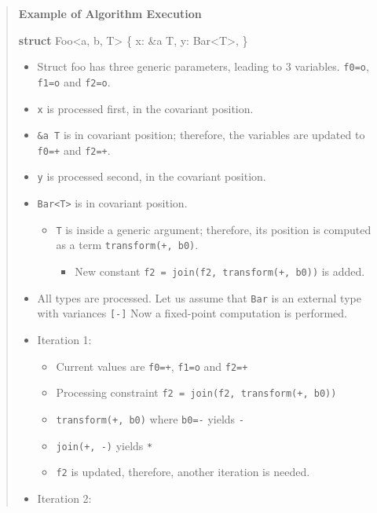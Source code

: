 \documentclass[
  11pt,
  twoside,symmetric]{report}
\newenvironment{Shaded}{}{}
\newcommand{\KeywordTok}[1]{\textbf{#1}}
\newcommand{\NormalTok}[1]{#1}
\newcommand{\OperatorTok}[1]{#1}
\newcommand{\OtherTok}[1]{#1}
\providecommand{\tightlist}{%
  \setlength{\itemsep}{0pt}\setlength{\parskip}{0pt}}
\begin{document}
\begin{quote}
\textbf{Example of Algorithm Execution}

\begin{Shaded}
\begin{Highlighting}[]
 \KeywordTok{struct}\NormalTok{ Foo}\OperatorTok{\textless{}}\OtherTok{\textquotesingle{}a}\OperatorTok{,} \OtherTok{\textquotesingle{}b}\OperatorTok{,}\NormalTok{ T}\OperatorTok{\textgreater{}} \OperatorTok{\{}
\NormalTok{     x}\OperatorTok{:} \OperatorTok{\&}\OtherTok{\textquotesingle{}a}\NormalTok{ T}\OperatorTok{,}
\NormalTok{     y}\OperatorTok{:}\NormalTok{ Bar}\OperatorTok{\textless{}}\NormalTok{T}\OperatorTok{\textgreater{},}
 \OperatorTok{\}}
\end{Highlighting}
\end{Shaded}

\begin{itemize}
\tightlist
\item
  Struct foo has three generic parameters, leading to 3 variables.
  \texttt{f0=o}, \texttt{f1=o} and \texttt{f2=o}.
\item
  \texttt{x} is processed first, in the covariant position.
\item
  \texttt{\&\textquotesingle{}a\ T} is in covariant position; therefore,
  the variables are updated to \texttt{f0=+} and \texttt{f2=+}.
\item
  \texttt{y} is processed second, in the covariant position.
\item
  \texttt{Bar\textless{}T\textgreater{}} is in covariant position.

  \begin{itemize}
  \tightlist
  \item
    \texttt{T} is inside a generic argument; therefore, its position is
    computed as a term \texttt{transform(+,\ b0)}.

    \begin{itemize}
    \tightlist
    \item
      New constant \texttt{f2\ =\ join(f2,\ transform(+,\ b0))} is
      added.
    \end{itemize}
  \end{itemize}
\item
  All types are processed. Let us assume that \texttt{Bar} is an
  external type with variances \texttt{{[}-{]}} Now a fixed-point
  computation is performed.
\item
  Iteration 1:

  \begin{itemize}
  \tightlist
  \item
    Current values are \texttt{f0=+}, \texttt{f1=o} and \texttt{f2=+}
  \item
    Processing constraint \texttt{f2\ =\ join(f2,\ transform(+,\ b0))}
  \item
    \texttt{transform(+,\ b0)} where \texttt{b0=-} yields \texttt{-}
  \item
    \texttt{join(+,\ -)} yields \texttt{*}
  \item
    \texttt{f2} is updated, therefore, another iteration is needed.
  \end{itemize}
\item
  Iteration 2:


\end{itemize}
\end{quote}
\end{document}
